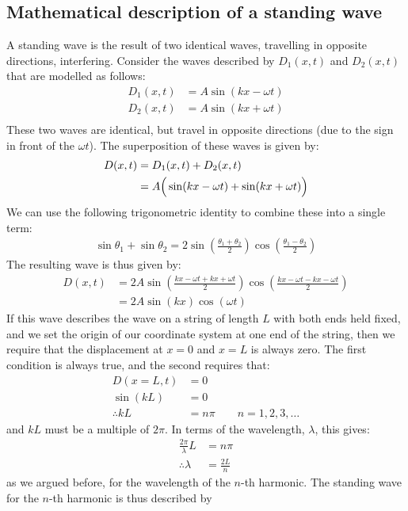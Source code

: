 \subsection{Mathematical description of a standing wave}
A standing wave is the result of two identical waves, travelling in opposite directions, interfering. Consider the waves described by $D_1(x,t)$ and $D_2(x,t)$ that are modelled as follows:
\begin{align*}
D_1(x,t) &= A\sin(kx-\omega t)\\
D_2(x,t) &= A\sin(kx+\omega t)\\
\end{align*}
These two waves are identical, but travel in opposite directions (due to the sign in front of the $\omega t$). The superposition of these waves is given by:
\begin{align*}
D(x,t) &= D_1(x,t) + D_2(x,t)\\
&=A\Bigr(\sin(kx-\omega t)+\sin(kx+\omega t)\Bigl)
\end{align*}
We can use the following trigonometric identity to combine these into a single term:
\begin{align*}
\sin\theta_1+\sin\theta_2 = 2\sin\left(\frac{\theta_1+\theta_2}{2} \right) \cos\left( \frac{\theta_1-\theta_2}{2}\right)
\end{align*}
The resulting wave is thus given by:
\begin{align*}
D(x,t) &= 2A\sin\left(\frac{kx-\omega t + kx+\omega t}{2} \right) \cos\left( \frac{kx-\omega t - kx-\omega t}{2}\right)\\
&=2A\sin(kx)\cos(\omega t)
\end{align*}
If this wave describes the wave on a string of length $L$ with both ends held fixed, and we set the origin of our coordinate system at one end of the string, then we require that the displacement at $x=0$ and $x=L$ is always zero. The first condition is always true, and the second requires that:
\begin{align*}
D(x=L,t) &= 0\\
\sin(kL) &= 0\\
\therefore kL &= n\pi \quad\quad n=1,2,3,\dots
\end{align*}
and $kL$ must be a multiple of $2\pi$. In terms of the wavelength, $\lambda$, this gives:
\begin{align*}
\frac{2\pi}{\lambda}L &= n\pi\\
\therefore \lambda&= \frac{2L}{n}
\end{align*}
as we argued before, for the wavelength of the $n$-th harmonic. The standing wave for the $n$-th harmonic is thus described by
